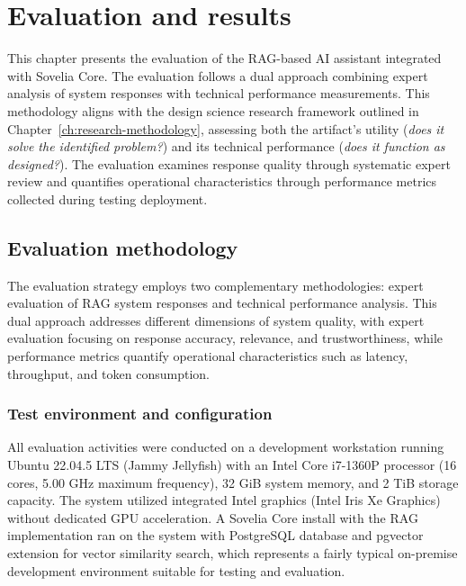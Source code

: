 \chapter{Evaluation and results}
\label{ch:evaluation-and-results}

This chapter presents the evaluation of the RAG-based AI assistant integrated with Sovelia Core. The evaluation follows a dual approach combining expert analysis of system responses with technical performance measurements. This methodology aligns with the design science research framework outlined in Chapter~\ref{ch:research-methodology}, assessing both the artifact's utility (\textit{does it solve the identified problem?}) and its technical performance (\textit{does it function as designed?}). The evaluation examines response quality through systematic expert review and quantifies operational characteristics through performance metrics collected during testing deployment.

\section{Evaluation methodology}
\label{sec:evaluation-methodology}

The evaluation strategy employs two complementary methodologies: expert evaluation of RAG system responses and technical performance analysis. This dual approach addresses different dimensions of system quality, with expert evaluation focusing on response accuracy, relevance, and trustworthiness, while performance metrics quantify operational characteristics such as latency, throughput, and token consumption.

\subsection{Test environment and configuration}
\label{subsec:test-environment}

All evaluation activities were conducted on a development workstation running Ubuntu 22.04.5 LTS (Jammy Jellyfish) with an Intel Core i7-1360P processor (16 cores, 5.00 GHz maximum frequency), 32 GiB system memory, and 2 TiB storage capacity. The system utilized integrated Intel graphics (Intel Iris Xe Graphics) without dedicated GPU acceleration. A Sovelia Core install with the RAG implementation ran on the system with PostgreSQL database and pgvector extension for vector similarity search, which represents a fairly typical on-premise development environment suitable for testing and evaluation.

